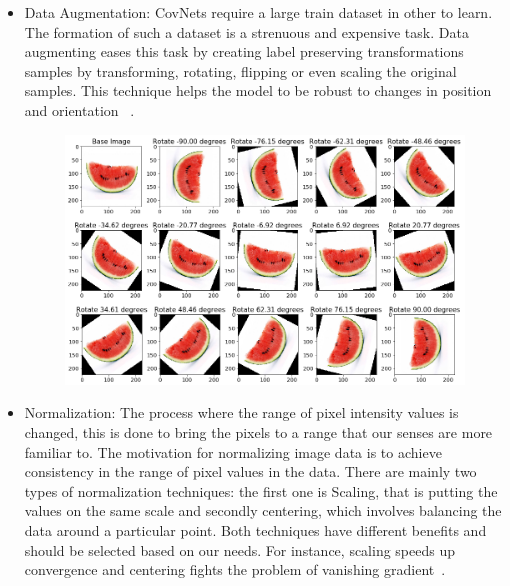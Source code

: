 \documentclass[12pt, a4paper,oneside]{report}
\begin{document}
\begin{itemize}
 	\item Data Augmentation: CovNets require a large train dataset in other to learn. The formation of such a dataset is a strenuous and expensive task. Data augmenting eases this task by creating label preserving transformations samples by transforming, rotating, flipping or even scaling the original samples. This technique helps the model to be robust to changes in position and orientation ~\cite{taylor2017improving}. 
 	
 	\begin{figure}[!htb]
 		\includegraphics [scale=0.44] {augmentation.png}
 		\label{fig:augment}
 	\end{figure}
 
 \item Normalization: The process where the range of pixel intensity values is changed, this is done to bring the pixels to a range that our senses are more familiar to. The motivation for normalizing image data is to achieve consistency in the range of pixel values in the data. There are mainly two types of normalization techniques: the first one is Scaling, that is putting the values on the same scale and secondly centering, which involves balancing the data around a particular point. Both techniques have different benefits and should be selected based on our needs. For instance, scaling speeds up convergence and centering fights the problem of vanishing gradient~\cite{normalizing}.

\end{itemize}
\end{document}
